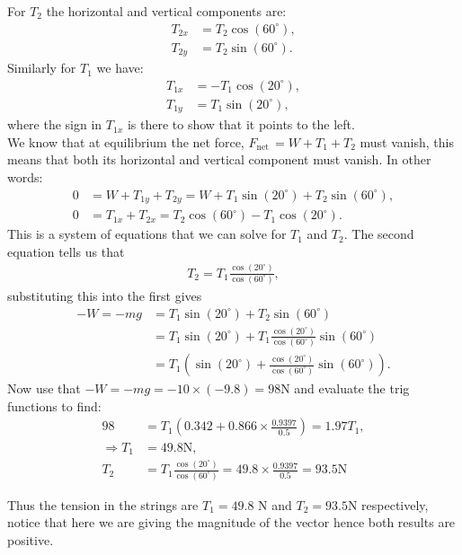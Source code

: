\documentclass[a4paper,12pt]{book}
\begin{document}
For $T_{2}$ the horizontal and vertical components are:
\begin{align*}
T_{2x}&=T_{2}\cos(60^{\circ}),\\
T_{2y}&=T_{2}\sin(60^{\circ}).
\end{align*}
Similarly for $T_{1}$ we have:
\begin{align*}
T_{1x}&=-T_{1}\cos(20^{\circ}),\\
T_{1y}&=T_{1}\sin(20^{\circ}),
\end{align*}
where the sign in $T_{1x}$ is there to show that it points to the left.\\

We know that at equilibrium the net force, $F_{\text{net}~}=W+T_{1}+T_{2}$ must vanish, this means that both its horizontal and vertical component must vanish. In other words:
\begin{align}
0&=W+T_{1y}+T_{2y}=W +T_{1}\sin(20^{\circ})+T_{2}\sin(60^{\circ}) \label{eq: vertical force components},\\
0&=T_{1x}+T_{2x}= T_{2}\cos(60^{\circ}) -T_{1}\cos(20^{\circ}) \label{eq: horizontal force components}.
\end{align}
This is a system of equations that we can solve for $T_{1}$ and $T_{2}$. The second equation tells us that 
\begin{align*}
T_{2}=T_{1}\frac{\cos(20^{\circ})}{\cos(60^{\circ})},
\end{align*}
substituting this into the first gives
\begin{align*}
-W=-mg	&=T_{1}\sin(20^{\circ})+T_{2}\sin(60^{\circ})\\
		&=T_{1}\sin(20^{\circ})+T_{1}\frac{\cos(20^{\circ})}{\cos(60^{\circ})}\sin(60^{\circ})\\
		&=T_{1}\left(\sin(20^{\circ})+\frac{\cos(20^{\circ})}{\cos(60^{\circ})}\sin(60^{\circ})\right).
\end{align*}
Now use that $-W=-mg=-10\times (-9.8)=98\text{N}$ and evaluate the trig functions to find:
\begin{align*}
98&=T_{1}\left(0.342+0.866\times\frac{0.9397}{0.5}\right)=1.97T_{1},\\
\Rightarrow T_{1}&=49.8\text{N},\\
T_{2}&=T_{1}\frac{\cos(20^{\circ})}{\cos(60^{\circ})}=49.8\times \frac{0.9397}{0.5}=93.5\text{N}
\end{align*}

Thus the tension in the strings are $T_{1}=49.8$ N and $T_{2}=93.5$N respectively, notice that here we are giving the magnitude of the vector hence both results are positive.\\
\end{document}
